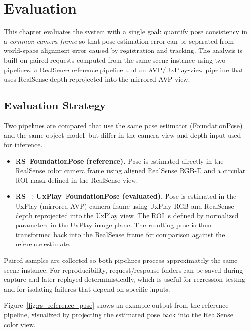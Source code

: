 \section{Evaluation}
\label{sec:evaluation}

This chapter evaluates the system with a single goal: quantify pose consistency in a \emph{common camera frame} so that pose-estimation error can be separated from world-space alignment error caused by registration and tracking. The analysis is built on paired requests computed from the same scene instance using two pipelines: a RealSense reference pipeline and an AVP/UxPlay-view pipeline that uses RealSense depth reprojected into the mirrored AVP view.

\subsection{Evaluation Strategy}
\label{subsec:eval_strategy}

Two pipelines are compared that use the same pose estimator (FoundationPose) and the same object model, but differ in the camera view and depth input used for inference.

\begin{itemize}
    \item \textbf{RS--FoundationPose (reference).} Pose is estimated directly in the RealSense color camera frame using aligned RealSense RGB-D and a circular ROI mask defined in the RealSense view.
    \item \textbf{RS$\rightarrow$UxPlay--FoundationPose (evaluated).} Pose is estimated in the UxPlay (mirrored AVP) camera frame using UxPlay RGB and RealSense depth reprojected into the UxPlay view. The ROI is defined by normalized parameters in the UxPlay image plane. The resulting pose is then transformed back into the RealSense frame for comparison against the reference estimate.
\end{itemize}

Paired samples are collected so both pipelines process approximately the same scene instance. For reproducibility, request/response folders can be saved during capture and later replayed deterministically, which is useful for regression testing and for isolating failures that depend on specific inputs.

Figure~\ref{fig:rs_reference_pose} shows an example output from the reference pipeline, visualized by projecting the estimated pose back into the RealSense color view.


